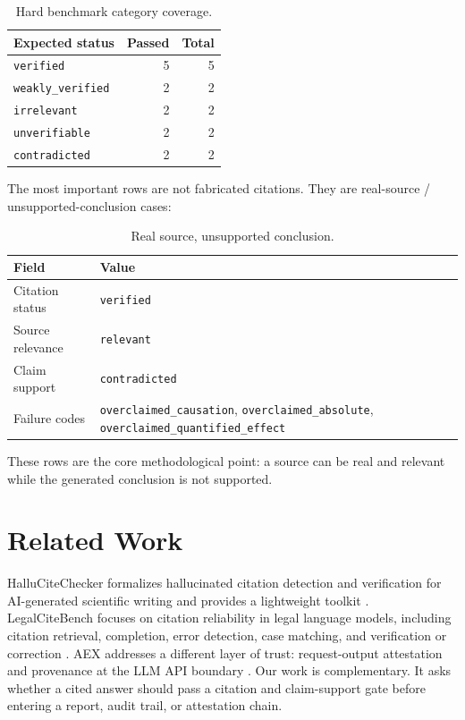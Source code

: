 \documentclass[11pt]{article}
\begin{document}
\begin{table}[h]
\centering
\small
\begin{tabular}{lrr}
\toprule
Expected status & Passed & Total \\
\midrule
\texttt{verified} & 5 & 5 \\
\texttt{weakly\_verified} & 2 & 2 \\
\texttt{irrelevant} & 2 & 2 \\
\texttt{unverifiable} & 2 & 2 \\
\texttt{contradicted} & 2 & 2 \\
\bottomrule
\end{tabular}
\caption{Hard benchmark category coverage.}
\label{tab:hard}
\end{table}

The most important rows are not fabricated citations. They are real-source / unsupported-conclusion cases:

\begin{table}[h]
\centering
\small
\begin{tabularx}{\columnwidth}{lX}
\toprule
Field & Value \\
\midrule
Citation status & \texttt{verified} \\
Source relevance & \texttt{relevant} \\
Claim support & \texttt{contradicted} \\
Failure codes & \texttt{overclaimed\_causation}, \texttt{overclaimed\_absolute}, \texttt{overclaimed\_quantified\_effect} \\
\bottomrule
\end{tabularx}
\caption{Real source, unsupported conclusion.}
\label{tab:claimsupport}
\end{table}

These rows are the core methodological point: a source can be real and relevant while the generated conclusion is not supported.

\section{Related Work}

HalluCiteChecker formalizes hallucinated citation detection and verification for AI-generated scientific writing and provides a lightweight toolkit \cite{sakai2026hallucitechecker}. LegalCiteBench focuses on citation reliability in legal language models, including citation retrieval, completion, error detection, case matching, and verification or correction \cite{chen2026legalcitebench}. AEX addresses a different layer of trust: request-output attestation and provenance at the LLM API boundary \cite{guan2026aex}. Our work is complementary. It asks whether a cited answer should pass a citation and claim-support gate before entering a report, audit trail, or attestation chain.
\end{document}
